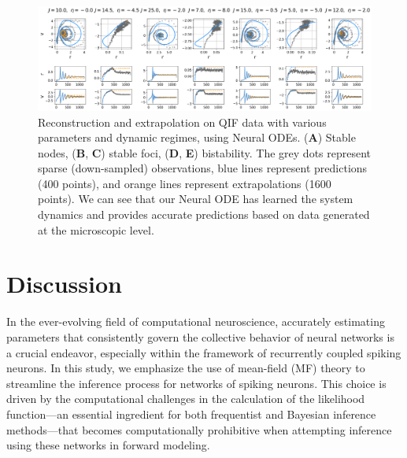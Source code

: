 \documentclass[preprint,11pt,authoryear]{elsarticle}
\begin{document}





\begin{figure}
    \centering
    \includegraphics[width=\linewidth]{Figs/Fig10.png}
    \caption{Reconstruction and extrapolation on QIF data with various parameters and dynamic regimes, using Neural ODEs. (\textbf{A}) Stable nodes, (\textbf{B}, \textbf{C}) stable foci, (\textbf{D}, \textbf{E}) bistability. The grey dots represent sparse (down-sampled) observations, blue lines represent predictions (400 points), and orange lines represent extrapolations (1600 points). We can see that our Neural ODE has learned the system dynamics and provides accurate predictions based on data generated at the microscopic level.} 
    \label{fig:NeuralODE_QIF}
\end{figure}



\section{Discussion}

In the ever-evolving field of computational neuroscience, accurately estimating parameters that consistently govern the collective behavior of neural networks is a crucial endeavor, especially within the framework of recurrently coupled spiking neurons. In this study, we emphasize the use of mean-field (MF) theory to streamline the inference process for networks of spiking neurons. This choice is driven by the computational challenges in the calculation of the likelihood function---an essential ingredient for both frequentist and Bayesian inference methods---that becomes computationally prohibitive when attempting inference using these networks in forward modeling.
\end{document}
